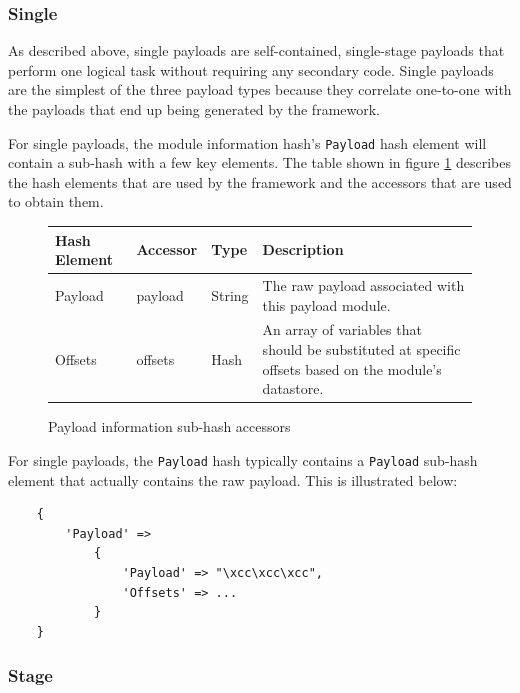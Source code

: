 \documentclass{report}
\begin{document}
            \subsubsection{Single}

\par
As described above, single payloads are self-contained, single-stage
payloads that perform one logical task without requiring any
secondary code.  Single payloads are the simplest of the three
payload types because they correlate one-to-one with the payloads
that end up being generated by the framework.

\par
For single payloads, the module information hash's \texttt{Payload}
hash element will contain a sub-hash with a few key elements. The
table shown in figure \ref{fig-table-single-payload-hash} describes
the hash elements that are used by the framework and the accessors
that are used to obtain them.

\begin{figure}[h]
\begin{center}
\begin{tabular}{|l|l|l|p{2.0in}|}
\hline
\textbf{Hash Element} & \textbf{Accessor} & \textbf{Type} & \textbf{Description} \\
\hline
Payload & payload & String & The raw payload associated with this payload module. \\
\hline
Offsets & offsets & Hash & An array of variables that should be substituted at specific offsets based on the module's datastore. \\
\hline
\end{tabular}
\caption{Payload information sub-hash accessors}
\label{fig-table-single-payload-hash}
\end{center}
\end{figure}

\par
For single payloads, the \texttt{Payload} hash typically contains a
\texttt{Payload} sub-hash element that actually contains the raw
payload.  This is illustrated below:

\begin{verbatim}
    {
        'Payload' =>
            {
                'Payload' => "\xcc\xcc\xcc",
                'Offsets' => ...
            }
    }
\end{verbatim}

            \subsubsection{Stage}
\end{document}
